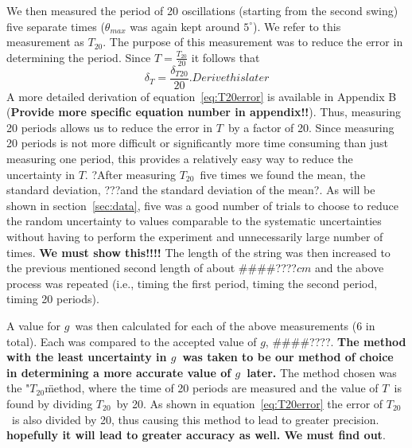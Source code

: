 \documentclass[iop]{emulateapj}
\def\g{$g$}
\def\T{$T$}
\def\Ttwen{$T_{20}$}
\def\fillin{\#\#\#\#????}
\def\deg{^{\circ}}
\begin{document}
We then measured the period of 20 oscillations (starting from the second 
swing) five separate times ($\theta_{max}$ was again kept around $5\deg$). 
We refer to this measurement as $T_{20}$. The purpose of this 
measurement was to reduce the error in determining the period.  Since 
$T=\frac{T_{20}}{20}$ it follows that
\begin{equation}
\label{eq:T20error}
\delta_T = \frac{\delta_{T20}}{20}.  Derive this later
\end{equation}
A more detailed derivation of equation~\ref{eq:T20error} is available in 
Appendix B ({\bf Provide more specific equation number in appendix!!}).
Thus, measuring 20 periods allows us to reduce the error in \T\ by a factor of 
20.  Since measuring 20 periods is not more difficult or significantly more 
time consuming than just measuring one period, this provides a relatively easy 
way to reduce the uncertainty in \T.  ?After measuring \Ttwen\ five times we 
found the mean, the standard deviation, ???and the standard deviation of the 
mean?.  As will be shown in section~\ref{sec:data}, five was a good number of trials to 
choose to reduce the random uncertainty to values comparable to the systematic 
uncertainties without having to perform the experiment and unnecessarily large 
number of times. {\bf We must show this!!!!}  The length of the string was 
then increased to the previous mentioned second length of 
about \fillin $cm$ and the above process was repeated (i.e., 
timing the first period, timing the second period, timing 20 periods).

A value for \g\ was then calculated for each of the above measurements (6 in 
total). Each was compared to the accepted value of \g, \fillin.  {\bf The 
method with the least uncertainty in \g\ was taken to be our method of choice 
in determining a more accurate value of \g\ later.}  The method chosen was the 
"\Ttwen\" method, where the time of 20 periods are measured and the value of 
\T\ is found by dividing \Ttwen\ by 20.  As shown in 
equation~\ref{eq:T20error} the error of \Ttwen\ is also divided by 20, thus 
causing this method to lead to greater precision.  {\bf hopefully it will lead 
to greater accuracy as well.  We must find out}. 
\end{document}
